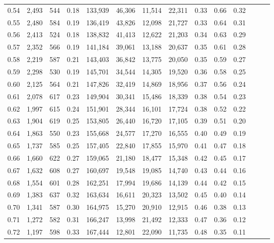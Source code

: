 \begin{tabular}{rrrrrrrrrrrrrr}
0.54 &  2,493 &  544 &  0.18 &  133,939 &   46,306 &  11,514 &  22,311 &  0.33 &  0.66 &      0.32 \\
0.55 &  2,480 &  584 &  0.19 &  136,419 &   43,826 &  12,098 &  21,727 &  0.33 &  0.64 &      0.31 \\
0.56 &  2,413 &  524 &  0.18 &  138,832 &   41,413 &  12,622 &  21,203 &  0.34 &  0.63 &      0.29 \\
0.57 &  2,352 &  566 &  0.19 &  141,184 &   39,061 &  13,188 &  20,637 &  0.35 &  0.61 &      0.28 \\
0.58 &  2,219 &  587 &  0.21 &  143,403 &   36,842 &  13,775 &  20,050 &  0.35 &  0.59 &      0.27 \\
0.59 &  2,298 &  530 &  0.19 &  145,701 &   34,544 &  14,305 &  19,520 &  0.36 &  0.58 &      0.25 \\
0.60 &  2,125 &  564 &  0.21 &  147,826 &   32,419 &  14,869 &  18,956 &  0.37 &  0.56 &      0.24 \\
0.61 &  2,078 &  617 &  0.23 &  149,904 &   30,341 &  15,486 &  18,339 &  0.38 &  0.54 &      0.23 \\
0.62 &  1,997 &  615 &  0.24 &  151,901 &   28,344 &  16,101 &  17,724 &  0.38 &  0.52 &      0.22 \\
0.63 &  1,904 &  619 &  0.25 &  153,805 &   26,440 &  16,720 &  17,105 &  0.39 &  0.51 &      0.20 \\
0.64 &  1,863 &  550 &  0.23 &  155,668 &   24,577 &  17,270 &  16,555 &  0.40 &  0.49 &      0.19 \\
0.65 &  1,737 &  585 &  0.25 &  157,405 &   22,840 &  17,855 &  15,970 &  0.41 &  0.47 &      0.18 \\
0.66 &  1,660 &  622 &  0.27 &  159,065 &   21,180 &  18,477 &  15,348 &  0.42 &  0.45 &      0.17 \\
0.67 &  1,632 &  608 &  0.27 &  160,697 &   19,548 &  19,085 &  14,740 &  0.43 &  0.44 &      0.16 \\
0.68 &  1,554 &  601 &  0.28 &  162,251 &   17,994 &  19,686 &  14,139 &  0.44 &  0.42 &      0.15 \\
0.69 &  1,383 &  637 &  0.32 &  163,634 &   16,611 &  20,323 &  13,502 &  0.45 &  0.40 &      0.14 \\
0.70 &  1,341 &  587 &  0.30 &  164,975 &   15,270 &  20,910 &  12,915 &  0.46 &  0.38 &      0.13 \\
0.71 &  1,272 &  582 &  0.31 &  166,247 &   13,998 &  21,492 &  12,333 &  0.47 &  0.36 &      0.12 \\
0.72 &  1,197 &  598 &  0.33 &  167,444 &   12,801 &  22,090 &  11,735 &  0.48 &  0.35 &      0.11 \\

\end{tabular}

